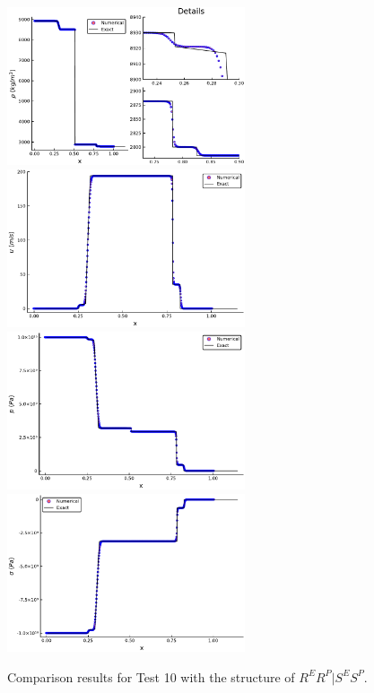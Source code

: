 \documentclass[review]{elsarticle}
\numberwithin{equation}{section}
\numberwithin{table}{section}
\begin{document}
\begin{figure}[ht]
  \centering
  \includegraphics[width= 7cm] {case8rho.pdf}
  \includegraphics[width= 7cm] {case8u.pdf}
  \includegraphics[width= 7cm] {case8p.pdf}
  \includegraphics[width= 7cm] {case8sigma.pdf}

    \caption{Comparison results for Test 10 with the structure of $R^ER^P|S^ES^P$.  }
  \label{fig:case8}
\end{figure}
\end{document}

